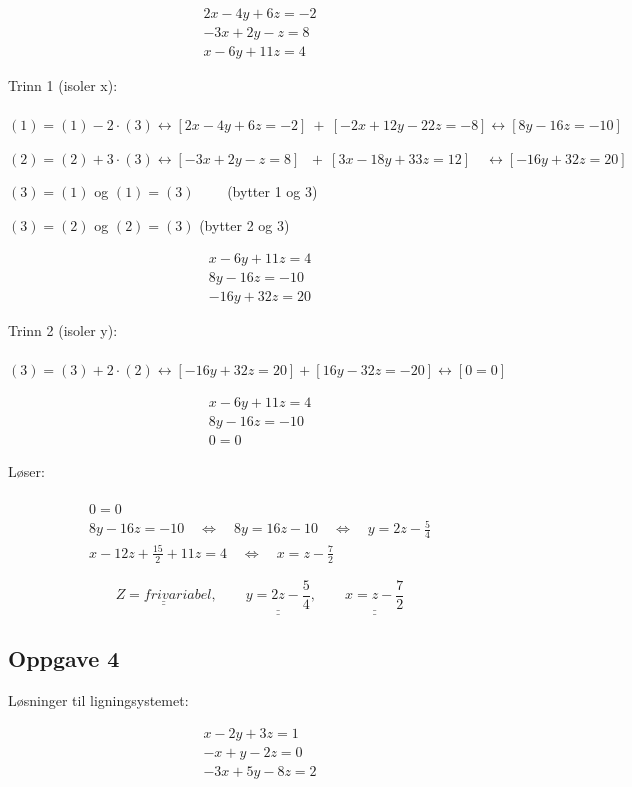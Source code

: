 \documentclass{article}
\newcommand{\uu}[1]{\underline{\underline{#1}}}
\newcommand{\lra}{\leftrightarrow}
\newcommand{\eq}{\quad\Longleftrightarrow\quad}
\begin{document}
\begin{align}
    2x - 4y + 6z = -2 \\
    -3x + 2y -z = 8 \\
    x - 6y + 11z = 4
\end{align}

Trinn 1 (isoler x): \\\\
$(1) = (1) - 2\cdot(3) \lra [2x-4y+6z=-2]\ +\ [-2x+12y-22z=-8] \lra [8y-16z = -10]$

$(2) = (2) + 3\cdot(3) \lra [-3x+2y-z=8]\ \ \, +\ [3x-18y+33z=12]\quad \lra [-16y+32z = 20]$ 

$(3) = (1)$ og $(1) = (3) \qquad$ (bytter 1 og 3)

$(3) = (2)$ og $(2) = (3)$ \qquad (bytter 2 og 3)

\begin{align}
    x - 6y + 11z = 4 \\
    8y - 16z = -10 \\
    -16y + 32z = 20 
\end{align}

Trinn 2 (isoler y): \\\\
$(3) = (3) + 2\cdot(2) \lra [-16y+32z=20] + [16y-32z = -20] \lra [0 = 0]$

\begin{align}
    x-6y+11z=4 \\
    8y-16z=-10 \\
    0 = 0
\end{align}

Løser: \\\\
\begin{align}
    0 = 0 \\
    8y-16z = -10 \eq 8y = 16z-10 \eq y = 2z - \frac{5}{4} \\
    x - 12z+\frac{15}{2} + 11z = 4 \eq x = z - \frac{7}{2} 
\end{align}

\[
\uu{Z = fri variabel}, \qquad \uu{y= 2z-\frac{5}{4}}, \qquad \uu{x = z-\frac{7}{2}}
\]
\newpage
\subsection*{Oppgave 4}
Løsninger til ligningsystemet:

\begin{align}
    x-2y+3z = 1 \\
    -x+y-2z=0 \\
    -3x+5y-8z=2
\end{align}
\end{document}
